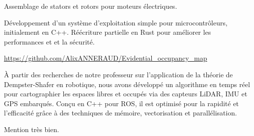 \documentclass[10pt,a4paper,ragged2e,withhyper]{../AltaCV/altacv}
\begin{document}
\begin{paracol}{2}
  Assemblage de stators et rotors pour moteurs électriques.

  \smallskip


    Développement d'un système d'exploitation simple pour microcontrôleurs, initialement en C++.
    Réécriture partielle en Rust pour améliorer les performances et et la sécurité.

  \divider

  {\url{https://github.com/AlixANNERAUD/Evidential_occupancy_map}}
  {}
  {}

  À partir des recherches de notre professeur sur l’application de la théorie de Dempster-Shafer en robotique, nous avons développé un algorithme en temps réel pour cartographier les espaces libres et occupés via des capteurs LiDAR, IMU et GPS embarqués.
  Conçu en C++ pour ROS, il est optimisé pour la rapidité et l’efficacité grâce à des techniques de mémoire, vectorisation et parallélisation.
  
  \medskip

  \switchcolumn



  \divider

  Mention très bien.

  \divider


  \smallskip



  \divider


  \divider




\end{paracol}
\end{document}
